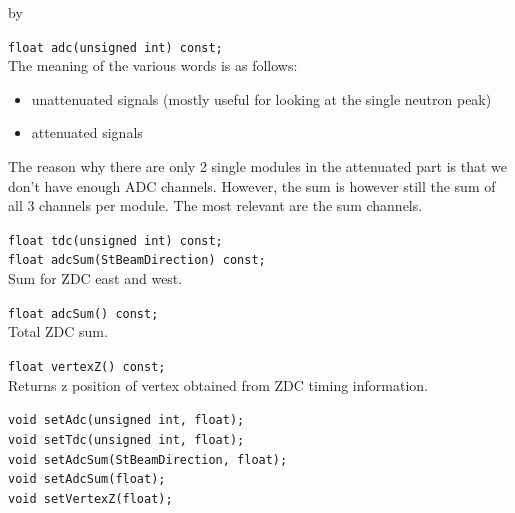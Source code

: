 \documentclass[twoside]{article}
\newcommand{\entrylabel}[1]{\mbox{\textbf{{#1}}}\hfil}%
\newenvironment{entry}
{\begin{list}{}%
    {\renewcommand{\makelabel}{\entrylabel}%
     \setlength{\labelwidth}{90pt}%
     \setlength{\leftmargin}{\labelwidth}
     \advance\leftmargin by \labelsep%
      }%
    }%
  {\end{list}}
\newcommand{\Entrylabel}[1]%
{\raisebox{0pt}[1ex][0pt]{\makebox[\labelwidth][l]%
    {\parbox[t]{\labelwidth}{\hspace{0pt}\textbf{{#1}}}}}}
\newenvironment{Entry}%
{\renewcommand{\entrylabel}{\Entrylabel}\begin{entry}}%
  {\end{entry}}
\begin{document}
\begin{Entry}
    \verb+float adc(unsigned int) const;+\\
    The meaning of the various words is as follows:
    \begin{itemize}
    \item unattenuated signals (mostly useful for looking at the single neutron peak)
    \item attenuated signals
    \end{itemize}
    
    The reason why there are only 2 single modules in the attenuated
    part is that we don't have enough ADC channels. However, the sum
    is however still the sum of all 3 channels per module. The most
    relevant are the sum channels.

    \verb+float tdc(unsigned int) const;+\\

    \verb+float adcSum(StBeamDirection) const;+\\
    Sum for ZDC east and west.
    
    \verb+float adcSum() const;+\\
    Total ZDC sum.

    \verb+float vertexZ() const;+\\
    Returns z position of vertex obtained from ZDC timing information.
    
    \verb+void setAdc(unsigned int, float);+\\
    \verb+void setTdc(unsigned int, float);+\\
    \verb+void setAdcSum(StBeamDirection, float);+\\
    \verb+void setAdcSum(float);+\\
    \verb+void setVertexZ(float);+\\
\end{Entry}
\clearpage
\end{document}
